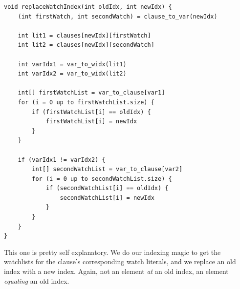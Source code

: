\documentclass[../main.tex]{subfiles}
\begin{document}
\begin{lstlisting}
void replaceWatchIndex(int oldIdx, int newIdx) {
    (int firstWatch, int secondWatch) = clause_to_var(newIdx)

    int lit1 = clauses[newIdx][firstWatch]
    int lit2 = clauses[newIdx][secondWatch]

    int varIdx1 = var_to_widx(lit1)
    int varIdx2 = var_to_widx(lit2)

    int[] firstWatchList = var_to_clause[var1]
    for (i = 0 up to firstWatchList.size) {
        if (firstWatchList[i] == oldIdx) {
            firstWatchList[i] = newIdx
        }
    }

    if (varIdx1 != varIdx2) {
        int[] secondWatchList = var_to_clause[var2]
        for (i = 0 up to secondWatchList.size) {
            if (secondWatchList[i] == oldIdx) {
                secondWatchList[i] = newIdx
            }
        }
    }
}
\end{lstlisting}
\noindent
This one is pretty self explanatory. We do our indexing magic to get the watchlists 
for the clause's corresponding watch literals, and we replace an old index with 
a new index. Again, not an element \textit{at} an old index, an element \textit{equaling}
an old index.
\end{document}
